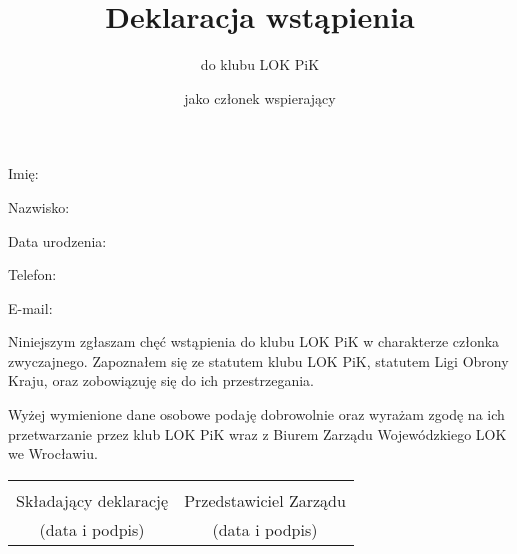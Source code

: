 \documentclass[a4paper,12pt]{article}
\title{Deklaracja wstąpienia}
\author{do klubu LOK PiK}
\date{jako członek wspierający}
\begin{document}
\maketitle
\thispagestyle{empty} %
Imię: \dotfill
\vspace{1em}

Nazwisko: \dotfill
\vspace{1em}

Data urodzenia: \dotfill
\vspace{1em}

Telefon: \dotfill
\vspace{1em}

E-mail: \dotfill
\vspace{1em}

Niniejszym zgłaszam chęć wstąpienia do klubu LOK PiK w charakterze członka zwyczajnego. Zapoznałem się ze statutem klubu LOK PiK, statutem Ligi Obrony Kraju, oraz zobowiązuję się do ich przestrzegania.

Wyżej wymienione dane osobowe podaję dobrowolnie oraz wyrażam zgodę na ich przetwarzanie przez klub LOK PiK wraz z Biurem Zarządu Wojewódzkiego LOK we Wrocławiu.
\vspace{4em}
\begin{center}
    \begin{tabular}{ c c }
        \dotfill & \dotfill \\
        Składający deklarację & Przedstawiciel Zarządu\\
        (data i podpis) & (data i podpis)
    \end{tabular}
\end{center}
\end{document}
